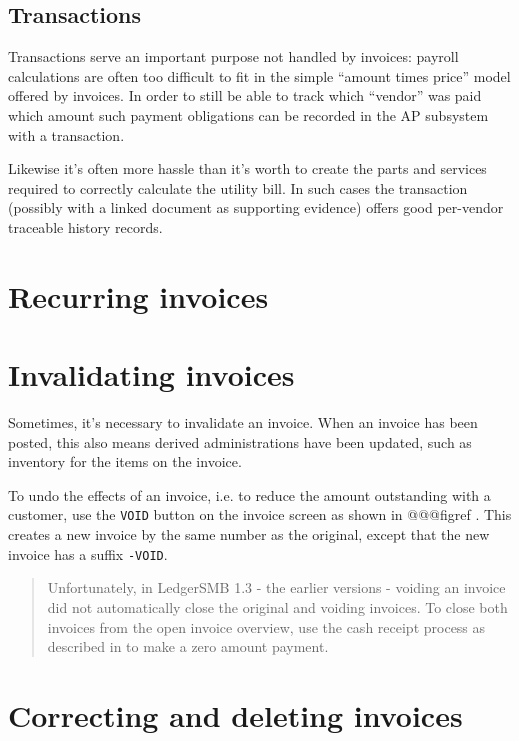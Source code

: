 
\subsection{Transactions}

Transactions serve an important purpose not handled by invoices: payroll
calculations are often too difficult to fit in the simple ``amount times price''
model offered by invoices. In order to still be able to track which ``vendor''
was paid which amount such payment obligations can be recorded in the AP subsystem
with a transaction.

Likewise it's often more hassle than it's worth to create the parts and services
required to correctly calculate the utility bill. In such cases the transaction
(possibly with a linked document as supporting evidence) offers good per-vendor
traceable history records.


\section{Recurring invoices}



\section{Invalidating invoices}

Sometimes, it's necessary to invalidate an invoice. When an invoice has been
posted, this also means derived administrations have been updated, such as
inventory for the items on the invoice.

To undo the effects of an invoice, i.e. to reduce the amount outstanding with a
customer, use the \texttt{VOID} button on the invoice screen as shown in @@@figref .
This creates a new invoice by the same number as the original, except that the new
invoice has a suffix \texttt{-VOID}.

\begin{quotation}
Unfortunately, in LedgerSMB 1.3 - the earlier versions - voiding an invoice did not
automatically close the original and voiding invoices.  To close both invoices from
the open invoice overview, use the cash receipt process as described in
 to make a zero amount payment.
\end{quotation}

\section{Correcting and deleting invoices}
\label{sec:CorrectingInvoices}

